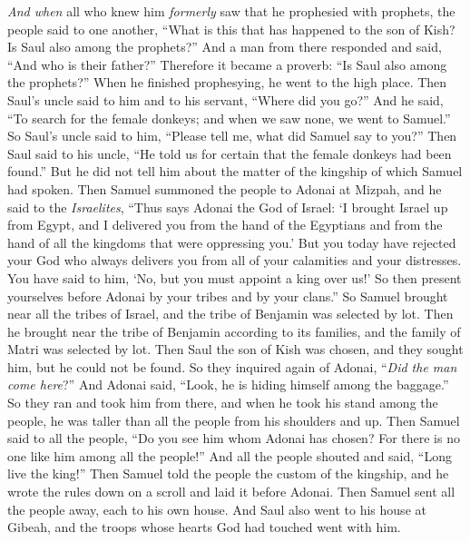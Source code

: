 \begin{biblechapter}
\verse \textit{And when} all who knew him \textit{formerly} saw that he prophesied with prophets, the people said to one another, “What is this that has happened to the son of Kish? Is Saul also among the prophets?”
\verse And a man from there responded and said, “And who is their father?” Therefore it became a proverb: “Is Saul also among the prophets?”
\verse When he finished prophesying, he went to the high place.
\verse Then Saul’s uncle said to him and to his servant, “Where did you go?” And he said, “To search for the female donkeys; and when we saw none, we went to Samuel.”
\verse So Saul’s uncle said to him, “Please tell me, what did Samuel say to you?”
\verse Then Saul said to his uncle, “He told us for certain that the female donkeys had been found.” But he did not tell him about the matter of the kingship of which Samuel had spoken.
\verse Then Samuel summoned the people to Adonai at Mizpah,
\verse and he said to the \textit{Israelites}, “Thus says Adonai the God of Israel: ‘I brought Israel up from Egypt, and I delivered you from the hand of the Egyptians and from the hand of all the kingdoms that were oppressing you.’
\verse But you today have rejected your God who always delivers you from all of your calamities and your distresses. You have said to him, ‘No, but you must appoint a king over us!’ So then present yourselves before Adonai by your tribes and by your clans.”
\verse So Samuel brought near all the tribes of Israel, and the tribe of Benjamin was selected by lot.
\verse Then he brought near the tribe of Benjamin according to its families, and the family of Matri was selected by lot. Then Saul the son of Kish was chosen, and they sought him, but he could not be found.
\verse So they inquired again of Adonai, “\textit{Did the man come here}?”  And Adonai said, “Look, he is hiding himself among the baggage.”
\verse So they ran and took him from there, and when he took his stand among the people, he was taller than all the people from his shoulders and up.
\verse Then Samuel said to all the people, “Do you see him whom Adonai has chosen? For there is no one like him among all the people!” And all the people shouted and said, “Long live the king!”
\verse Then Samuel told the people the custom of the kingship, and he wrote the rules down on a scroll and laid it before Adonai. Then Samuel sent all the people away, each to his own house.
\verse And Saul also went to his house at Gibeah, and the troops whose hearts God had touched went with him.

\end{biblechapter}
